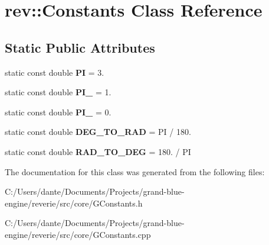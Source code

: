\hypertarget{classrev_1_1_constants}{}\section{rev\+::Constants Class Reference}
\label{classrev_1_1_constants}
\subsection*{Static Public Attributes}
\begin{DoxyCompactItemize}
\item 
\mbox{\label{classrev_1_1_constants_a13e5e5a03cc4e0140c3572aae941c443}} 
static const double {\bfseries PI} = 3.
\item 
\mbox{\label{classrev_1_1_constants_af977a852627cc14784fb925ef4ae834c}} 
static const double {\bfseries P\+I\+\_} = 1.
\item 
\mbox{\label{classrev_1_1_constants_ae3e7e02876275406cf13fe61b08a6eff}} 
static const double {\bfseries P\+I\+\_} = 0.
\item 
\mbox{\label{classrev_1_1_constants_ad6361aaa000fd863f9019a4f3799abd7}} 
static const double {\bfseries D\+E\+G\+\_\+\+T\+O\+\_\+\+R\+AD} = PI / 180.
\item 
\mbox{\label{classrev_1_1_constants_ab6d3711fa4cac03b8db78538c3c93b13}} 
static const double {\bfseries R\+A\+D\+\_\+\+T\+O\+\_\+\+D\+EG} = 180. / PI
\end{DoxyCompactItemize}


The documentation for this class was generated from the following files\+:\begin{DoxyCompactItemize}
\item 
C\+:/\+Users/dante/\+Documents/\+Projects/grand-\/blue-\/engine/reverie/src/core/G\+Constants.\+h\item 
C\+:/\+Users/dante/\+Documents/\+Projects/grand-\/blue-\/engine/reverie/src/core/G\+Constants.\+cpp\end{DoxyCompactItemize}
